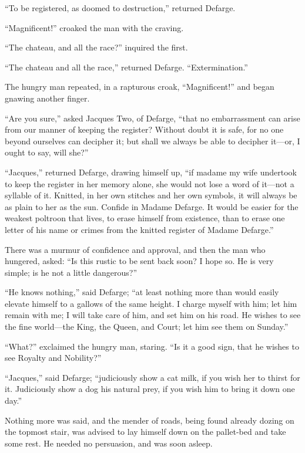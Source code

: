 ``To be registered, as doomed to destruction,'' returned Defarge.

``Magnificent!'' croaked the man with the craving.

``The chateau, and all the race?'' inquired the first.

``The chateau and all the race,'' returned Defarge.  ``Extermination.''

The hungry man repeated, in a rapturous croak, ``Magnificent!'' and began
gnawing another finger.

``Are you sure,'' asked Jacques Two, of Defarge, ``that no embarrassment
can arise from our manner of keeping the register?  Without doubt it
is safe, for no one beyond ourselves can decipher it; but shall we
always be able to decipher it---or, I ought to say, will she?''

``Jacques,'' returned Defarge, drawing himself up, ``if madame my wife
undertook to keep the register in her memory alone, she would not
lose a word of it---not a syllable of it.  Knitted, in her own stitches
and her own symbols, it will always be as plain to her as the sun.
Confide in Madame Defarge.  It would be easier for the weakest poltroon
that lives, to erase himself from existence, than to erase one letter
of his name or crimes from the knitted register of Madame Defarge.''

There was a murmur of confidence and approval, and then the man who
hungered, asked:  ``Is this rustic to be sent back soon?  I hope so.
He is very simple; is he not a little dangerous?''

``He knows nothing,'' said Defarge; ``at least nothing more than would
easily elevate himself to a gallows of the same height.  I charge myself
with him; let him remain with me; I will take care of him, and set him
on his road.  He wishes to see the fine world---the King, the Queen, and
Court; let him see them on Sunday.''

``What?'' exclaimed the hungry man, staring.  ``Is it a good sign, that
he wishes to see Royalty and Nobility?''

``Jacques,'' said Defarge; ``judiciously show a cat milk, if you wish
her to thirst for it.  Judiciously show a dog his natural prey,
if you wish him to bring it down one day.''

Nothing more was said, and the mender of roads, being found already
dozing on the topmost stair, was advised to lay himself down on the
pallet-bed and take some rest.  He needed no persuasion,
and was soon asleep.

